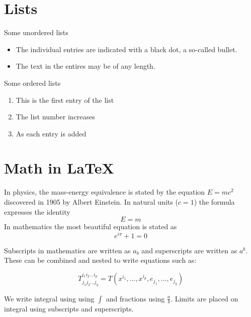 \documentclass[12pt, a4paper]{report}
\begin{document}
\section{Lists}

Some unordered lists
\begin{itemize}
    \item The individual entries are indicated with a black dot, a so-called bullet.
    \item The text in the entires may be of any length.
\end{itemize}

Some ordered lists
\begin{enumerate}
    \item This is the first entry of the list
    \item The list number increases
    \item As each entry is added
\end{enumerate}

\section{Math in \LaTeX{}}

In physics, the mass-energy equivalence is stated by the equation $E = mc^2$ discovered in 1905 by Albert Einstein. %
In natural units ($c = 1$) the formula expresses the identity
\[ E = m \] %
In mathematics the most beautiful equation is stated as
\begin{equation}
    e^{i\pi} + 1 = 0
\end{equation}



Subscripts in mathematics are written as $a_b$ and superscripts are written as $a^b$. These can be combined and nested to write equations such as:

\[ T^{i_1 i_2 \dots i_p}_{j_1 j_2 \dots j_q} = T(x^{i_1},\dots,x^{i_p},e_{j_1},\dots,e_{j_q}) \]

We write integral using using $\int$ and fractions using $\frac{a}{b}$. Limits are placed on integral using subscripts and superscripts.
\end{document}
